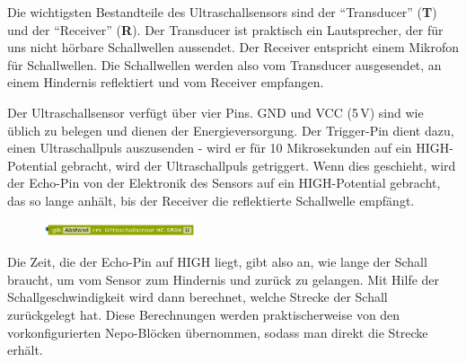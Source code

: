 \begin{figure}
	\centering
\end{figure}
Die wichtigsten Bestandteile des Ultraschallsensors sind der \enquote{Transducer} (\textbf{T}) und der \enquote{Receiver} (\textbf{R}). Der Transducer ist praktisch ein Lautsprecher, der für uns nicht hörbare Schallwellen aussendet. Der Receiver entspricht einem Mikrofon für Schallwellen. Die Schallwellen werden also vom Transducer ausgesendet, an einem Hindernis reflektiert und vom Receiver empfangen.

Der Ultraschallsensor verfügt über vier Pins. GND und VCC (5\,V) sind wie üblich zu belegen und dienen der Energieversorgung. Der Trigger-Pin dient dazu, einen Ultraschallpuls auszusenden - wird er für 10 Mikrosekunden auf ein HIGH-Potential gebracht, wird der Ultraschallpuls getriggert. Wenn dies geschieht, wird der Echo-Pin von der Elektronik des Sensors auf ein HIGH-Potential gebracht, das so lange anhält, bis der Receiver die reflektierte Schallwelle empfängt. 

\begin{figure}
	\centering
	\includegraphics[width=0.4\textwidth]{./pics/gibEntfernung.png}
\end{figure}
Die Zeit, die der Echo-Pin auf HIGH liegt, gibt also an, wie lange der Schall braucht, um vom Sensor zum Hindernis und zurück zu gelangen. 
%
Mit Hilfe der Schallgeschwindigkeit wird dann berechnet, welche Strecke der Schall zurückgelegt hat. Diese Berechnungen werden praktischerweise von den vorkonfigurierten Nepo-Blöcken übernommen, sodass man direkt die Strecke erhält.

